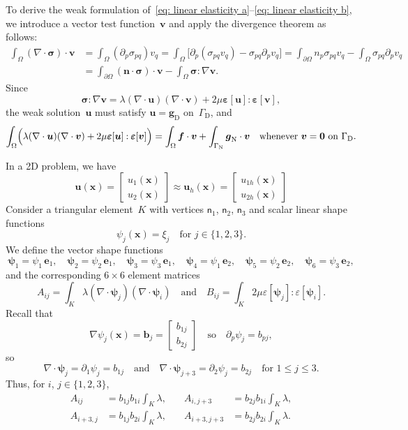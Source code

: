 \documentclass[a4paper,12pt]{article}
\newcommand{\bs}[1]{\boldsymbol{#1}}
\newcommand{\uD}{\mathrm{D}}
\newcommand{\uN}{\mathrm{N}}
\newcommand{\GammaN}{\Gamma_{\uN}}
\newcommand{\GammaD}{\Gamma_{\uD}}
\begin{document}
To derive the weak formulation
of~\eqref{eq: linear elasticity a}--\eqref{eq: linear elasticity b}, we
introduce a vector test function~$\bs{v}$ and apply the divergence theorem as
follows:
\begin{align*}
\int_\Omega(\nabla\cdot\bs{\sigma})\cdot\bs{v}
    &=\int_\Omega(\partial_p\sigma_{pq})v_q
    =\int_\Omega\bigl[\partial_p(\sigma_{pq}v_q)-\sigma_{pq}\partial_pv_q\bigr]
=\int_{\partial\Omega}n_p\sigma_{pq}v_q-\int_\Omega\sigma_{pq}\partial_pv_q\\
    &=\int_{\partial\Omega}(\bs{n}\cdot\bs{\sigma})\cdot\bs{v}
    -\int_\Omega\bs{\sigma}\mathbin{:}\nabla\bs{v}.
\end{align*}
Since
\[
\bs{\sigma}\mathbin{:}\nabla\bs{v}=\lambda(\nabla\cdot\bs{u})(\nabla\cdot\bs{v})
    +2\mu\bs{\varepsilon}[\bs{u}]\mathbin{:}\bs{\varepsilon}[\bs{v}],
\]
the weak solution~$\bs{u}$ must satisfy $\bs{u}=\bs{g}_{\uD}$ on~$\GammaD$, and
\[
\int_\Omega\Bigl(\lambda(\nabla\cdot\bs{u})(\nabla\cdot\bs{v})
    +2\mu\bs{\varepsilon}[\bs{u}]\mathbin{:}\bs{\varepsilon}[\bs{v}]\Bigr)
    =\int_\Omega\bs{f}\cdot\bs{v}+\int_{\GammaN}\bs{g}_{\uN}\cdot\bs{v}
\quad\text{whenever $\bs{v}=\bs{0}$ on $\GammaD$.}
\]

In a 2D problem, we have
\[
\bs{u}(\bs{x})=\begin{bmatrix}u_1(\bs{x})\\ u_2(\bs{x})\end{bmatrix}
    \approx\bs{u}_h(\bs{x})
    =\begin{bmatrix}u_{1h}(\bs{x})\\ u_{2h}(\bs{x})\end{bmatrix}
\]
Consider a triangular element~$K$ with vertices $\mathsf{n}_1$, $\mathsf{n}_2$,
$\mathsf{n}_3$ and scalar linear shape functions 
\[
\psi_j(\bs{x})=\xi_j\quad\text{for $j\in\{1,2,3\}$.}
\]
We define the vector shape functions
\begin{equation}\label{eq: vector shape}
\bs{\psi}_1=\psi_1\,\bs{e}_1,\quad
\bs{\psi}_2=\psi_2\,\bs{e}_1,\quad
\bs{\psi}_3=\psi_3\,\bs{e}_1,\quad
\bs{\psi}_4=\psi_1\,\bs{e}_2,\quad
\bs{\psi}_5=\psi_2\,\bs{e}_2,\quad
\bs{\psi}_6=\psi_3\,\bs{e}_2,
\end{equation}
and the corresponding $6\times6$ element matrices
\[
A_{ij}=\int_K\lambda(\nabla\cdot\bs{\psi}_j)(\nabla\cdot\bs{\psi}_i)
\quad\text{and}\quad
B_{ij}=\int_K2\mu\varepsilon[\bs{\psi}_j]:\varepsilon[\bs{\psi}_i].
\]
Recall that
\[
\nabla\psi_j(\bs{x})=\bs{b}_j=\begin{bmatrix}b_{1j}\\ b_{2j}\end{bmatrix}
\quad\text{so}\quad\partial_p\psi_j=b_{pj},
\]
so
\[
\nabla\cdot\bs{\psi}_j=\partial_1\psi_j=b_{1j}
\quad\text{and}\quad
\nabla\cdot\bs{\psi}_{j+3}=\partial_2\psi_j=b_{2j}
\quad\text{for $1\le j\le3$.}
\]
Thus, for $i$, $j\in\{1,2,3\}$,
\[
\begin{aligned}
A_{ij}&=b_{1j}b_{1i}\int_K\lambda,&\quad 
A_{i,j+3}&=b_{2j}b_{1i}\int_K\lambda,\\
A_{i+3,j}&=b_{1j}b_{2i}\int_K\lambda,&\quad 
A_{i+3,j+3}&=b_{2j}b_{2i}\int_K\lambda.
\end{aligned}
\]
\end{document}
